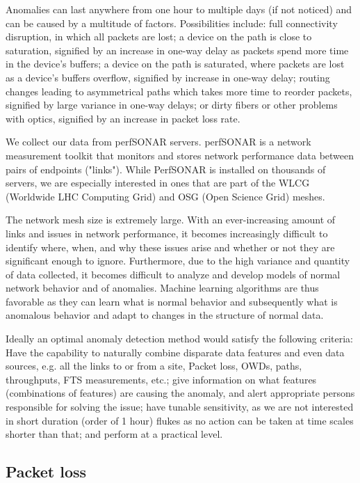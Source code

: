 \documentclass[5p]{elsarticle}
\begin{document}
Anomalies can last anywhere from one hour to multiple days (if not noticed) and can be caused by a multitude of factors. Possibilities include: full connectivity disruption, in which all packets are lost; a device on the path is close to saturation, signified by an increase in one-way delay as packets spend more time in the device’s buffers; a device on the path is saturated, where packets are lost as a device’s buffers overflow, signified by increase in one-way delay; routing changes leading to asymmetrical paths which takes more time to reorder packets, signified by large variance in one-way delays; or dirty fibers or other problems with optics, signified by an increase in packet loss rate.

We collect our data from perfSONAR \cite{jedan} servers. perfSONAR is a network measurement toolkit that monitors and stores network performance data between pairs of endpoints ("links"). While PerfSONAR is installed on thousands of servers, we are especially interested in ones that are part of the WLCG (Worldwide LHC Computing Grid) and OSG (Open Science Grid) meshes.

The network mesh size is extremely large. With an ever-increasing amount of links and issues in network performance, it becomes increasingly difficult to identify where, when, and why these issues arise and whether or not they are significant enough to ignore. Furthermore, due to the high variance and quantity of data collected, it becomes difficult to analyze and develop models of normal network behavior and of anomalies. Machine learning algorithms are thus favorable as they can learn what is normal behavior and subsequently what is anomalous behavior and adapt to changes in the structure of normal data.

Ideally an optimal anomaly detection method would satisfy the following criteria: Have the capability to naturally combine disparate data features and even data sources, e.g. all the links to or from a site, Packet loss, OWDs, paths, throughputs, FTS measurements, etc.; give information on what features (combinations of features) are causing the anomaly, and alert appropriate persons responsible for solving the issue; have tunable sensitivity, as we are not interested in short duration (order of 1 hour) flukes as no action can be taken at time scales shorter than that; and perform at a practical level.

\subsection{Packet loss}
\end{document}

